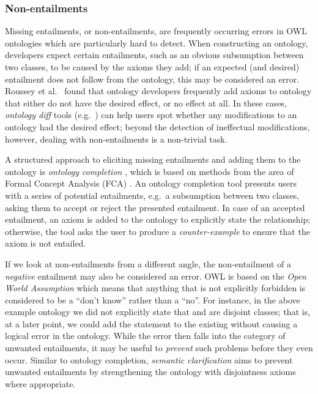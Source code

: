\subsubsection{Non-entailments} 

Missing entailments, or non-entailments, are frequently occurring errors in OWL ontologies which are particularly hard to detect. When constructing an ontology, developers expect certain entailments, such as an obvious subsumption between two classes, to be caused by the axioms they add; if an expected (and desired) entailment does not follow from the ontology, this may be considered an error. Roussey et al.\ \cite{roussey09ab} found that ontology developers frequently add axioms to ontology that either do not have the desired effect, or no effect at all. In these cases, \emph{ontology diff} tools (e.g.\ \cite{franconi10bg,goncalves11xz,kremen11yc}) can help users spot whether any modifications to an ontology had the desired effect; beyond the detection of ineffectual modifications, however, dealing with non-entailments is a non-trivial task.

A structured approach to eliciting missing entailments and adding them to the ontology is \emph{ontology completion} \cite{baader07aa}, which is based on methods from the area of Formal Concept Analysis (FCA) \cite{ganter05ar}. An ontology completion tool presents users with a series of potential entailments, e.g.\ a subsumption between two classes, asking them to accept or reject the presented entailment. In case of an accepted entailment, an axiom is added to the ontology to explicitly state the relationship; otherwise, the tool asks the user to produce a \emph{counter-example} to ensure that the axiom is not entailed. 

If we look at non-entailments from a different angle, the non-entailment of a \emph{negative} entailment may also be considered an error. OWL is based on the \emph{Open World Assumption} which means that anything that is not explicitly forbidden is considered to be a \enquote{don't know} rather than a \enquote{no}. For instance, in the above example ontology we did not explicitly state that  and  are disjoint classes; that is, at a later point, we could add the statement  to the existing  without causing a logical error in the ontology. While the error then falls into the category of unwanted entailments, it may be useful to \emph{prevent} such problems before they even occur. Similar to ontology completion, \emph{semantic clarification} \cite{schlobach05tf} aims to prevent unwanted entailments by strengthening the ontology with disjointness axioms where appropriate.



